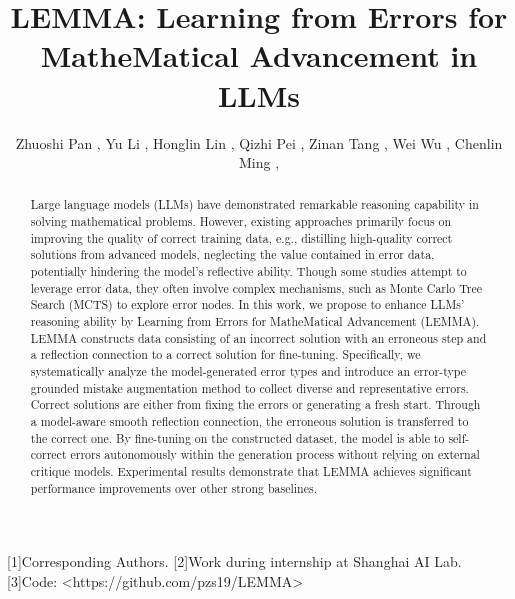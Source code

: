 \documentclass{llncs}
\title{LEMMA: Learning from Errors for MatheMatical Advancement in LLMs}
\author{Zhuoshi Pan , Yu Li , Honglin Lin , Qizhi Pei , Zinan Tang , Wei Wu , Chenlin Ming ,\inst{1}
}
\institute{H. Vicky Zhao1, Conghui He2,*, Lijun Wu2,*
}
\begin{document}
\maketitle

\begin{abstract}
Large language models (LLMs) have demonstrated remarkable reasoning capability in solving mathematical problems. However, existing approaches primarily focus on improving the quality of correct training data, e.g., distilling high-quality correct solutions from advanced models, neglecting the value contained in error data, potentially hindering the model's reflective ability. Though some studies attempt to leverage error data, they often involve complex mechanisms, such as Monte Carlo Tree Search (MCTS) to explore error nodes. In this work, we propose to enhance LLMs' reasoning ability by Learning from Errors for MatheMatical Advancement (LEMMA). LEMMA constructs data consisting of an incorrect solution with an erroneous step and a reflection connection to a correct solution for fine-tuning. Specifically, we systematically analyze the model-generated error types and introduce an error-type grounded mistake augmentation method to collect diverse and representative errors. Correct solutions are either from fixing the errors or generating a fresh start. Through a model-aware smooth reflection connection, the erroneous solution is transferred to the correct one. By fine-tuning on the constructed dataset, the model is able to self-correct errors autonomously within the generation process without relying on external critique models. Experimental results demonstrate that LEMMA achieves significant performance improvements over other strong baselines.
\end{abstract}



[1]Corresponding Authors. [2]Work during internship at Shanghai AI Lab. [3]Code: <https://github.com/pzs19/LEMMA>
\end{document}
